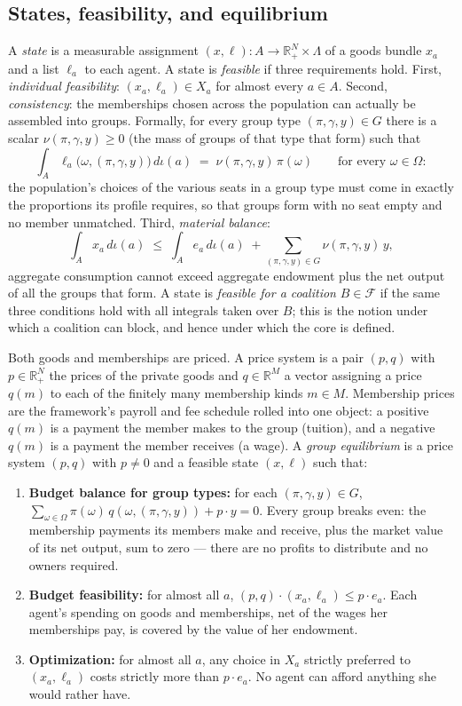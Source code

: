 \documentclass[12pt,letterpaper]{article}
\theoremstyle{definition}
\newcommand{\R}{\mathbb{R}}
\begin{document}
\subsection{States, feasibility, and equilibrium}

A \emph{state} is a measurable assignment $(x,\ell):A\rightarrow\R^N_+\times\Lambda$ of a goods bundle $x_a$ and a list $\ell_a$ to each agent.
A state is \emph{feasible} if three requirements hold.
First, \emph{individual feasibility}: $(x_a,\ell_a)\in X_a$ for almost every $a\in A$.
Second, \emph{consistency}: the memberships chosen across the population can actually be assembled into groups.
Formally, for every group type $(\pi,\gamma,y)\in G$ there is a scalar $\nu(\pi,\gamma,y)\geq 0$ (the mass of groups of that type that form) such that
\[
\int_A \ell_a\big(\omega,(\pi,\gamma,y)\big)\,d\iota(a) \;=\; \nu(\pi,\gamma,y)\,\pi(\omega)
\qquad\text{for every } \omega\in\Omega :
\]
the population's choices of the various seats in a group type must come in exactly the proportions its profile requires, so that groups form with no seat empty and no member unmatched.
Third, \emph{material balance}:
\[
\int_A x_a\,d\iota(a) \;\leq\; \int_A e_a\,d\iota(a) \;+ \sum_{(\pi,\gamma,y)\in G}\nu(\pi,\gamma,y)\,y ,
\]
aggregate consumption cannot exceed aggregate endowment plus the net output of all the groups that form.
A state is \emph{feasible for a coalition} $B\in\mathcal{F}$ if the same three conditions hold with all integrals taken over $B$; this is the notion under which a coalition can block, and hence under which the core is defined.

Both goods and memberships are priced.
A price system is a pair $(p,q)$ with $p\in\R^N_+$ the prices of the private goods and $q\in\R^{M}$ a vector assigning a price $q(m)$ to each of the finitely many membership kinds $m\in M$.
Membership prices are the framework's payroll and fee schedule rolled into one object: a positive $q(m)$ is a payment the member makes to the group (tuition), and a negative $q(m)$ is a payment the member receives (a wage).
A \emph{group equilibrium} is a price system $(p,q)$ with $p\neq 0$ and a feasible state $(x,\ell)$ such that:
\begin{enumerate}
\item \textbf{Budget balance for group types:} for each $(\pi,\gamma,y)\in G$, $\sum_{\omega\in\Omega}\pi(\omega)\,q(\omega,(\pi,\gamma,y)) + p\cdot y = 0$.
Every group breaks even: the membership payments its members make and receive, plus the market value of its net output, sum to zero --- there are no profits to distribute and no owners required.
\item \textbf{Budget feasibility:} for almost all $a$, $(p,q)\cdot(x_a,\ell_a)\leq p\cdot e_a$.
Each agent's spending on goods and memberships, net of the wages her memberships pay, is covered by the value of her endowment.
\item \textbf{Optimization:} for almost all $a$, any choice in $X_a$ strictly preferred to $(x_a,\ell_a)$ costs strictly more than $p\cdot e_a$.
No agent can afford anything she would rather have.
\end{enumerate}
\end{document}
